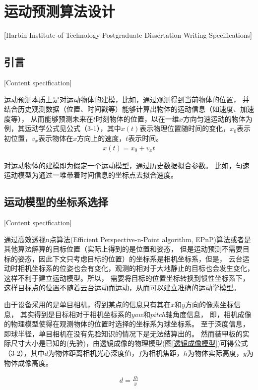 


\chapter[运动预测算法设计]{运动预测算法设计}[Harbin Institute of Technology Postgraduate Dissertation Writing Specifications]


\section{引言}[Content specification]

运动预测本质上是对运动物体的建模，比如，通过观测得到当前物体的位置，
并结合历史观测数据（位置、时间戳等）能够计算出物体的运动信息（如速度、加速度等），
从而能够预测未来在$t$时刻物体的位置，以在一维$x$方向匀速运动的物体为例，其运动学公式见公式（3-1），其中$x(t)$表示物理位置随时间的变化，$x_0$表示初位置，$v_x$表示物体在$x$方向上的速度，$t$表示时间。
\begin{gather}
    x(t) = x_0 + v_xt \label{linear_model}
\end{gather}

对运动物体的建模即为假定一个运动模型，通过历史数据拟合参数。
比如，匀速运动模型为通过一堆带着时间信息的坐标点去拟合速度。




\section{运动模型的坐标系选择}[Content specification]

通过高效透视n点算法(Efficient Perspective-n-Point algorithm, EPnP)算法或者是其他算法解算的目标位置（实际上得到的是位置和姿态，
但是运动预测不需要目标的姿态，因此下文只考虑目标的位置）的坐标系是相机坐标系，但是，
云台运动时相机坐标系的位姿也会有变化，观测的相对于大地静止的目标也会发生变化，这样不利于建立运动模型。所以，
需要将目标的位置坐标转换到惯性坐标系下，这样目标点的位置不随着云台运动而运动，从而可以建立准确的运动学模型。\par
由于设备采用的是单目相机，得到某点的信息只有其在$x$和$y$方向的像素坐标信息，
其实得到是目标相对于相机坐标系的$yaw$和$pitch$轴角度信息，
即，相机成像的物理模型使得在观测物体的位置时选择的坐标系为球坐标系。
至于深度信息，即球半径，单目相机在没有先验知识的情况下是无法结算出的。
然而装甲板的实际尺寸大小是已知的(先验)，由透镜成像的物理模型(图\ref{透镜成像模型})可得公式（3-2），其中$d$为物体距离相机光心深度值，$f$为相机焦距，$h$为物体实际高度，$y$为物体成像高度。\par
\begin{gather}
    d = \frac{fh}{y} 
\end{gather}

